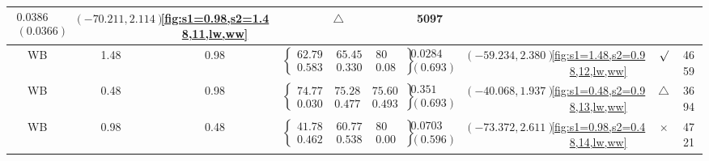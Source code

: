 \begin{table}[H]
\begin{adjustwidth}{-2.5cm}{-2.5cm}
{\begin{tabular}{|c|c|c|c|c|c|c|c|c|}
$\begin{array}{c}
0.0386 \\
(0.0366)
\end{array}$ & 
$(-70.211, 2.114)$ & 
\ref{fig:s1=0.98,s2=1.48,11,lw,ww} & $\triangle$ & 5097 \\
\hline
WB & 1.48 & 0.98 & $\left\{\begin{array}{ccc}
62.798 & 65.451 & 80 \\
0.583 & 0.330 & 0.087
\end{array}\right\}$ &
$\begin{array}{c}
0.0284 \\
(0.693)
\end{array}$ & 
$(-59.234, 2.380)$ & 
\ref{fig:s1=1.48,s2=0.98,12,lw,ww} & $\surd$ & 4659 \\
\hline
WB & 0.48 & 0.98 & $\left\{\begin{array}{ccc}
74.778 & 75.283 & 75.604 \\
0.030 & 0.477 & 0.493
\end{array}\right\}$ &
$\begin{array}{c}
0.351 \\
(0.693)
\end{array}$ & 
$(-40.068, 1.937)$ & 
\ref{fig:s1=0.48,s2=0.98,13,lw,ww} & $\triangle$ & 3694 \\
\hline
WB & 0.98 & 0.48 & $\left\{\begin{array}{ccc}
41.785 & 60.771 & 80 \\
0.462 & 0.538 & 0.000
\end{array}\right\}$ &
$\begin{array}{c}
0.0703 \\
(0.596)
\end{array}$ & 
$(-73.372, 2.611)$ & 
\ref{fig:s1=0.98,s2=0.48,14,lw,ww} & $\times$ & 4721 \\
\hline
\end{tabular}
}
\end{adjustwidth}
\end{table}

